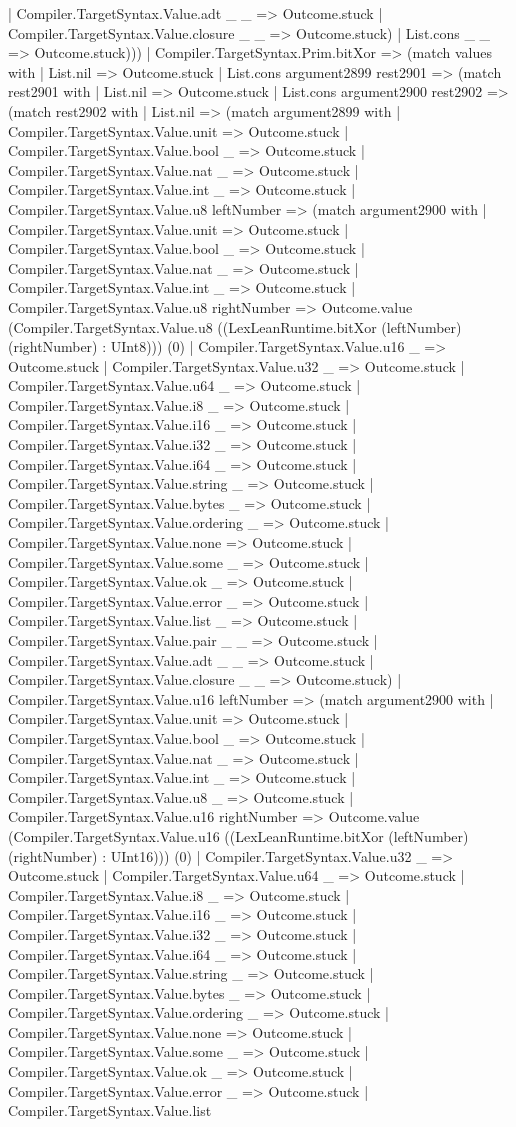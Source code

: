 \documentclass[11pt]{article}
\begin{document}
| Compiler.TargetSyntax.Value.adt \_ \_ => Outcome.stuck | Compiler.TargetSyntax.Value.closure \_ \_ => Outcome.stuck) | List.cons \_ \_ => Outcome.stuck))) | Compiler.TargetSyntax.Prim.bitXor => (match values with | List.nil => Outcome.stuck | List.cons argument2899 rest2901 => (match rest2901 with | List.nil => Outcome.stuck | List.cons argument2900 rest2902 => (match rest2902 with | List.nil => (match argument2899 with | Compiler.TargetSyntax.Value.unit => Outcome.stuck | Compiler.TargetSyntax.Value.bool \_ => Outcome.stuck | Compiler.TargetSyntax.Value.nat \_ => Outcome.stuck | Compiler.TargetSyntax.Value.int \_ => Outcome.stuck | Compiler.TargetSyntax.Value.u8 leftNumber => (match argument2900 with | Compiler.TargetSyntax.Value.unit => Outcome.stuck | Compiler.TargetSyntax.Value.bool \_ => Outcome.stuck | Compiler.TargetSyntax.Value.nat \_ => Outcome.stuck | Compiler.TargetSyntax.Value.int \_ => Outcome.stuck | Compiler.TargetSyntax.Value.u8 rightNumber => Outcome.value (Compiler.TargetSyntax.Value.u8 ((LexLeanRuntime.bitXor (leftNumber) (rightNumber) : UInt8))) (0) | Compiler.TargetSyntax.Value.u16 \_ => Outcome.stuck | Compiler.TargetSyntax.Value.u32 \_ => Outcome.stuck | Compiler.TargetSyntax.Value.u64 \_ => Outcome.stuck | Compiler.TargetSyntax.Value.i8 \_ => Outcome.stuck | Compiler.TargetSyntax.Value.i16 \_ => Outcome.stuck | Compiler.TargetSyntax.Value.i32 \_ => Outcome.stuck | Compiler.TargetSyntax.Value.i64 \_ => Outcome.stuck | Compiler.TargetSyntax.Value.string \_ => Outcome.stuck | Compiler.TargetSyntax.Value.bytes \_ => Outcome.stuck | Compiler.TargetSyntax.Value.ordering \_ => Outcome.stuck | Compiler.TargetSyntax.Value.none => Outcome.stuck | Compiler.TargetSyntax.Value.some \_ => Outcome.stuck | Compiler.TargetSyntax.Value.ok \_ => Outcome.stuck | Compiler.TargetSyntax.Value.error \_ => Outcome.stuck | Compiler.TargetSyntax.Value.list \_ => Outcome.stuck | Compiler.TargetSyntax.Value.pair \_ \_ => Outcome.stuck | Compiler.TargetSyntax.Value.adt \_ \_ => Outcome.stuck | Compiler.TargetSyntax.Value.closure \_ \_ => Outcome.stuck) | Compiler.TargetSyntax.Value.u16 leftNumber => (match argument2900 with | Compiler.TargetSyntax.Value.unit => Outcome.stuck | Compiler.TargetSyntax.Value.bool \_ => Outcome.stuck | Compiler.TargetSyntax.Value.nat \_ => Outcome.stuck | Compiler.TargetSyntax.Value.int \_ => Outcome.stuck | Compiler.TargetSyntax.Value.u8 \_ => Outcome.stuck | Compiler.TargetSyntax.Value.u16 rightNumber => Outcome.value (Compiler.TargetSyntax.Value.u16 ((LexLeanRuntime.bitXor (leftNumber) (rightNumber) : UInt16))) (0) | Compiler.TargetSyntax.Value.u32 \_ => Outcome.stuck | Compiler.TargetSyntax.Value.u64 \_ => Outcome.stuck | Compiler.TargetSyntax.Value.i8 \_ => Outcome.stuck | Compiler.TargetSyntax.Value.i16 \_ => Outcome.stuck | Compiler.TargetSyntax.Value.i32 \_ => Outcome.stuck | Compiler.TargetSyntax.Value.i64 \_ => Outcome.stuck | Compiler.TargetSyntax.Value.string \_ => Outcome.stuck | Compiler.TargetSyntax.Value.bytes \_ => Outcome.stuck | Compiler.TargetSyntax.Value.ordering \_ => Outcome.stuck | Compiler.TargetSyntax.Value.none => Outcome.stuck | Compiler.TargetSyntax.Value.some \_ => Outcome.stuck | Compiler.TargetSyntax.Value.ok \_ => Outcome.stuck | Compiler.TargetSyntax.Value.error \_ => Outcome.stuck | Compiler.TargetSyntax.Value.list 
\end{document}
